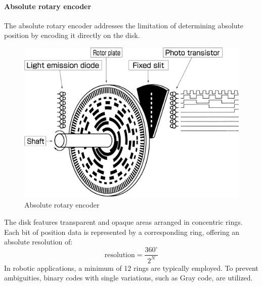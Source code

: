 \paragraph*{Absolute rotary encoder}
The absolute rotary encoder addresses the limitation of determining absolute position by encoding it directly on the disk.
\begin{figure}[H]
    \centering
    \includegraphics[width=0.5\linewidth]{images/rotary2.png}
    \caption{Absolute rotary encoder}
\end{figure}
The disk features transparent and opaque areas arranged in concentric rings. 
Each bit of position data is represented by a corresponding ring, offering an absolute resolution of:
\[\text{resolution}=\dfrac{360^{\circ}}{2^N}\]
In robotic applications, a minimum of 12 rings are typically employed. 
To prevent ambiguities, binary codes with single variations, such as Gray code, are utilized.

